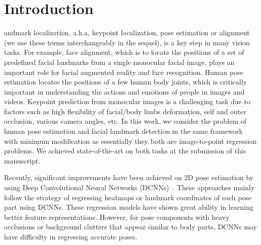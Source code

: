 \documentclass[10pt,journal,compsoc]{IEEEtran}
\begin{document}
%
\maketitle
\IEEEdisplaynontitleabstractindextext
\IEEEpeerreviewmaketitle

\tableofcontents
\clearpage


\vspace{0.1cm}




\section{Introduction}\label{sec:introduction}



andmark localization, a.k.a, keypoint localization, pose estimation or alignment (we use these terms interchangeably in the sequel), is a key step in many vision tasks.
For example, face alignment, which is to locate the positions of a set of predefined facial landmarks from a single monocular facial image, plays an important role for facial augmented reality and face recognition.
Human pose estimation locates the positions of a few human body joints, which is critically important in understanding the actions and emotions of people in images and videos.
Keypoint prediction from monocular images is a challenging task due to factors such as high flexibility of facial/body limbs deformation, self and outer occlusion, various camera angles, etc.
In this work, we consider the problem of human pose estimation and facial landmark detection in the same framework with minimum modification as essentially they both are image-to-point regression problems. We achieved state-of-the-art on both tasks at the submission of this manuscript.



Recently, significant improvements have been achieved on 2D pose estimation by using Deep Convolutional Neural Networks (DCNNs)~\cite{jourabloo2017pose,trigeorgis2016mnemonic,kowalski2017deep,conf/nips/TompsonJLB14,conf/cvpr/TompsonGJLB15,conf/cvpr/ToshevS14,conf/cvpr/ChuOLW16,conf/cvpr/WeiRKS16,conf/eccv/NewellYD16,conf/eccv/BulatT16}.
These approaches mainly follow the strategy of regressing heatmaps or landmark coordinates of each pose part using DCNNs.
These regression models have shown great ability in learning better feature representations.
However, for pose components with heavy occlusions or background clutters that appear similar to body parts, DCNNs may have difficulty in regressing accurate poses.
\end{document}
